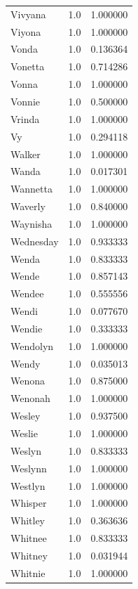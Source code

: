 \documentclass[
  letterpaper,
  DIV=11,
  numbers=noendperiod]{scrreprt}
\begin{document}
\begin{tabular}{lrr}
Vivyana         &   1.0 &   1.000000 \\
Viyona          &   1.0 &   1.000000 \\
Vonda           &   1.0 &   0.136364 \\
Vonetta         &   1.0 &   0.714286 \\
Vonna           &   1.0 &   1.000000 \\
Vonnie          &   1.0 &   0.500000 \\
Vrinda          &   1.0 &   1.000000 \\
Vy              &   1.0 &   0.294118 \\
Walker          &   1.0 &   1.000000 \\
Wanda           &   1.0 &   0.017301 \\
Wannetta        &   1.0 &   1.000000 \\
Waverly         &   1.0 &   0.840000 \\
Waynisha        &   1.0 &   1.000000 \\
Wednesday       &   1.0 &   0.933333 \\
Wenda           &   1.0 &   0.833333 \\
Wende           &   1.0 &   0.857143 \\
Wendee          &   1.0 &   0.555556 \\
Wendi           &   1.0 &   0.077670 \\
Wendie          &   1.0 &   0.333333 \\
Wendolyn        &   1.0 &   1.000000 \\
Wendy           &   1.0 &   0.035013 \\
Wenona          &   1.0 &   0.875000 \\
Wenonah         &   1.0 &   1.000000 \\
Wesley          &   1.0 &   0.937500 \\
Weslie          &   1.0 &   1.000000 \\
Weslyn          &   1.0 &   0.833333 \\
Weslynn         &   1.0 &   1.000000 \\
Westlyn         &   1.0 &   1.000000 \\
Whisper         &   1.0 &   1.000000 \\
Whitley         &   1.0 &   0.363636 \\
Whitnee         &   1.0 &   0.833333 \\
Whitney         &   1.0 &   0.031944 \\
Whitnie         &   1.0 &   1.000000 \\

\end{tabular}
\end{document}

